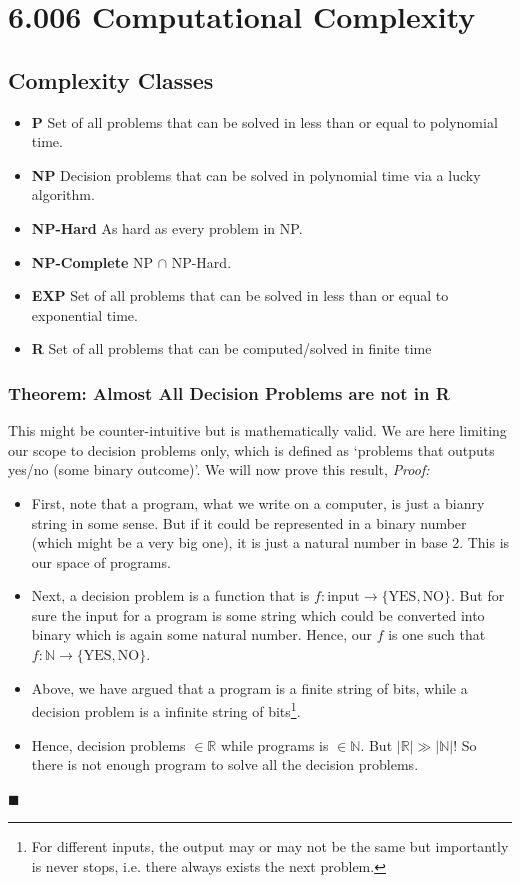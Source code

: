 \documentclass[10pt]{article}
\newcommand{\real}{\mathbb{R}}
\begin{document}
\section{6.006 Computational Complexity}
\subsection{Complexity Classes}
\begin{itemize}
    \item \textbf{P} Set of all problems that can be solved in less than or equal to polynomial time.
    \item \textbf{NP} Decision problems that can be solved in polynomial time via a lucky algorithm.
    \item \textbf{NP-Hard} As hard as every problem in NP.
    \item \textbf{NP-Complete} NP $\cap$ NP-Hard.
    \item \textbf{EXP} Set of all problems that can be solved in less than or equal to exponential time.
    \item \textbf{R} Set of all problems that can be computed/solved in finite time
\end{itemize}

\subsubsection{Theorem: Almost All Decision Problems are not in R}
This might be counter-intuitive but is mathematically valid. We are here limiting our scope to decision problems only, which is defined as `problems that outputs yes/no (some binary outcome)'. We will now prove this result, \textit{Proof:}
\begin{itemize}
    \item First, note that a program, what we write on a computer, is just a bianry string in some sense. But if it could be represented in a binary number (which might be a very big one), it is just a natural number in base 2. This is our space of programs.
    \item Next, a decision problem is a function that is $f: \text{input} \rightarrow \{\text{YES}, \text{NO}\}$. But for sure the input for a program is some string which could be converted into binary which is again some natural number. Hence, our $f$ is one such that $f:\mathbb{N} \rightarrow \{\text{YES}, \text{NO}\}$. 
    \item Above, we have argued that a program is a finite string of bits, while a decision problem is a infinite string of bits\footnote{For different inputs, the output may or may not be the same but importantly is never stops, i.e. there always exists the next problem.}.
    \item Hence, decision problems $\in \real$ while programs is $\in \mathbb{N}$. But $|\mathbb{R}| \gg |\mathbb{N}|$! So there is not enough program to solve all the decision problems. 
\end{itemize}
\hfill $\blacksquare$
\end{document}
